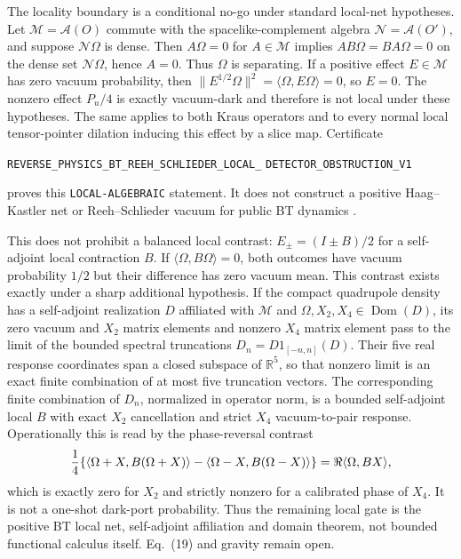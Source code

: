 \documentclass[11pt]{article}
\theoremstyle{definition}
\theoremstyle{remark}
\begin{document}
The locality boundary is a conditional no-go under standard local-net
hypotheses.  Let $\mathcal M=\mathcal A(O)$ commute with the
spacelike-complement algebra $\mathcal N=\mathcal A(O')$, and suppose
$\mathcal N\Omega$ is dense.  Then $A\Omega=0$ for $A\in\mathcal M$ implies
$AB\Omega=BA\Omega=0$ on the dense set $\mathcal N\Omega$, hence $A=0$.
Thus $\Omega$ is separating.  If a positive effect $E\in\mathcal M$ has zero
vacuum probability, then
$\|E^{1/2}\Omega\|^2=\langle\Omega,E\Omega\rangle=0$, so $E=0$.
The nonzero effect $P_u/4$ is exactly vacuum-dark and therefore is not local
under these hypotheses.  The same applies to both Kraus operators and to
every normal local tensor-pointer dilation inducing this effect by a slice
map.  Certificate
\par\noindent
\texttt{REVERSE\_PHYSICS\_BT\_REEH\_SCHLIEDER\_LOCAL\_}
\allowbreak\texttt{DETECTOR\_OBSTRUCTION\_V1}
\par\noindent
proves this \texttt{LOCAL-ALGEBRAIC} statement.  It does not construct a
positive Haag--Kastler net or Reeh--Schlieder vacuum for public BT dynamics
\cite{ReehSchlieder}.

This does not prohibit a balanced local contrast:
$E_\pm=(I\pm B)/2$ for a self-adjoint local contraction $B$.  If
$\langle\Omega,B\Omega\rangle=0$, both outcomes have vacuum probability
$1/2$ but their difference has zero vacuum mean.  This contrast exists
exactly under a sharp additional hypothesis.  If the compact quadrupole
density has a self-adjoint realization $D$ affiliated with $\mathcal M$ and
$\Omega,X_2,X_4\in\operatorname{Dom}(D)$, its zero vacuum and $X_2$ matrix
elements and nonzero $X_4$ matrix element pass to the limit of the bounded
spectral truncations $D_n=D1_{[-n,n]}(D)$.  Their five real response
coordinates span a closed subspace of $\mathbb R^5$, so that nonzero limit is
an exact finite combination of at most five truncation vectors.  The
corresponding finite combination of $D_n$, normalized in operator norm, is a
bounded self-adjoint local $B$ with exact $X_2$ cancellation and strict
$X_4$ vacuum-to-pair response.  Operationally this is read by the
phase-reversal contrast
\[
 {1\over4}\{\langle\Omega+X,B(\Omega+X)\rangle
 -\langle\Omega-X,B(\Omega-X)\rangle\}
 =\Re\langle\Omega,BX\rangle ,
\]
which is exactly zero for $X_2$ and strictly nonzero for a calibrated phase of
$X_4$.  It is not a one-shot dark-port probability.  Thus the remaining local
gate is the positive BT local net, self-adjoint affiliation and domain
theorem, not bounded functional calculus itself.  Eq.~(19) and gravity remain
open.
\end{document}
